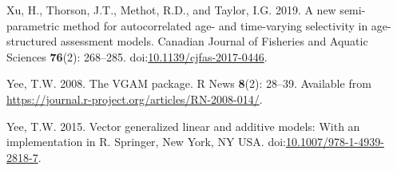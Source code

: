 \documentclass[
  12pt,
]{article}
\newlength{\cslhangindent}
\newenvironment{CSLReferences}[2] %
 {\begin{list}{}{%
  \setlength{\itemindent}{0pt} %
  \setlength{\leftmargin}{0pt} %
  \setlength{\parsep}{0pt} %
  \ifodd #1
   \setlength{\leftmargin}{\cslhangindent} %
   \setlength{\itemindent}{-1\cslhangindent} %
  \fi
  \setlength{\itemsep}{#2\baselineskip}}} %
 {\end{list}} %
\begin{document}
\begin{CSLReferences}{1}{0}
Xu, H., Thorson, J.T., Methot, R.D., and Taylor, I.G. 2019. A new
semi-parametric method for autocorrelated age- and time-varying
selectivity in age-structured assessment models. Canadian Journal of
Fisheries and Aquatic Sciences \textbf{76}(2): 268--285.
doi:\href{https://doi.org/10.1139/cjfas-2017-0446}{10.1139/cjfas-2017-0446}.

Yee, T.W. 2008. The {VGAM} package. R News \textbf{8}(2): 28--39.
Available from
\url{https://journal.r-project.org/articles/RN-2008-014/}.

Yee, T.W. 2015. Vector generalized linear and additive models: With an
implementation in {R}. Springer, New York, NY USA.
doi:\href{https://doi.org/10.1007/978-1-4939-2818-7}{10.1007/978-1-4939-2818-7}.

\end{CSLReferences}

\pagebreak

\clearpage
\end{document}
